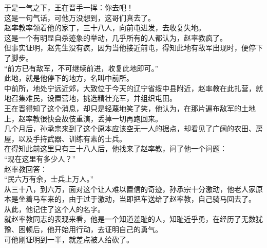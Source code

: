 \begin{multicols}{\theparacolNo}
于是一气之下，王在晋手一挥：你去吧！\\

这是一句气话，可他万没想到，这哥们真去了。\\

赵率教率领着他的家丁，三十八人，向前屯进发，去收复失地。\\

这是一个有明显自杀迹象的举动，几乎所有的人都认为，赵率教疯了。\\

但事实证明，赵先生没有疯，因为当他接近前屯，得知此地有敌军出现时，便停下了脚步。\\

“前方已有敌军，不可继续前进，收复此地即可。”\\

此地，就是他停下的地方，名叫中前所。\\

中前所，地处宁远近郊，大致位于今天的辽宁省绥中县附近，赵率教在此扎营，就地召集难民，设置营地，挑选精壮充军，并组织屯田。\\

王在晋得知了这个消息，却只是轻蔑地笑了笑，他认为，在那片遍布敌军的土地上，赵率教很快会故伎重演，丢掉一切再跑回来。\\

几个月后，孙承宗来到了这个原本应该空无一人的据点，却看见了广阔的农田、房屋，以及手持武器、训练有素的士兵。\\

在得知此前这里只有三十八人后，他找来了赵率教，问了他一个问题：\\

“现在这里有多少人？”\\

赵率教回答：\\

“民六万有余，士兵上万人。”\\

从三十八，到六万，面对这个让人难以置信的奇迹，孙承宗十分激动，他老人家原本是坐着马车来的，由于过于激动，当即把车送给了赵率教，自己骑马回去了。\\

从此，他记住了这个人的名字。\\

就赵率教同志的表现来看，他是一个知道羞耻的人，知耻近乎勇，在经历了无数犹豫、困顿后，他开始用行动，去证明自己的勇气。\\

可他刚证明到一半，就差点被人给砍了。\\


\end{multicols}
